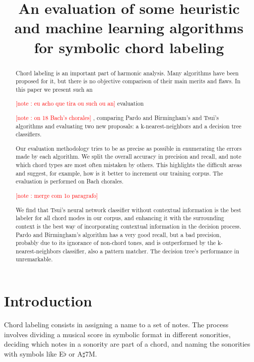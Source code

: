 \documentclass{article}
\title{An evaluation of some heuristic and machine learning algorithms for
  symbolic chord labeling}
\newcounter{notecounter}
\newcommand{\note}[1]{
  \addtocounter{notecounter}{1}
  \textcolor{red}{[note \arabic{notecounter}: #1]}
}
\begin{document}
\graphicspath{{figs/}{data/}}
\maketitle

\begin{abstract}

  Chord labeling is an important part of harmonic analysis. Many
  algorithms have been proposed for it, but there is no objective
  comparison of their main merits and flaws. In this paper we present
  such an \note{eu acho que tira ou such ou an} evaluation \note{on 18
  Bach's chorales}, comparing
  Pardo and Birmingham's and Tsui's algorithms and evaluating two new
  proposals: a k-nearest-neighbors and a decision tree classifiers.
  
  Our evaluation methodology tries to be as precise as possible in
  enumerating the errors made by each algorithm. We split the overall
  accuracy in precision and recall, and note which chord types are
  most often mistaken by others. This highlights the difficult areas
  and suggest, for example, how is it better to increment our training
  corpus. The evaluation is performed on Bach chorales. \note{merge
    com 1o paragrafo}
  
  We find that Tsui's neural network classifier without contextual
  information is the best labeler for all chord modes in our corpus,
  and enhancing it with the surrounding context is the best way of
  incorporating contextual information in the decision process. Pardo
  and Birmingham's algorithm has a very good recall, but a bad
  precision, probably due to its ignorance of non-chord tones, and is
  outperformed by the k-nearest-neighbors classifier, also a pattern
  matcher. The decision tree's performance in unremarkable.
\end{abstract}

\section{Introduction}
\label{sec:introduction}

Chord labeling consists in assigning a name to a set of notes. The
process involves dividing a musical score in symbolic format in
different sonorities, deciding which notes in a sonority are part of a
chord, and naming the sonorities with symbols like E$\flat$ or
A$\sharp$7M.
\end{document}
